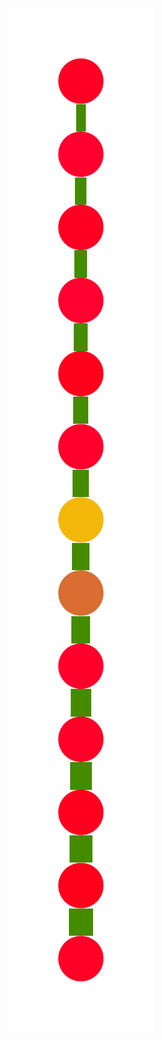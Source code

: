\documentclass[a4paper,10pt]{article}
\begin{document}
\begin{figure}
{    \includegraphics[scale=.14]{../figures/vector/6-3-recursion-induced-4.pdf}
}
\end{figure}
\end{document}
